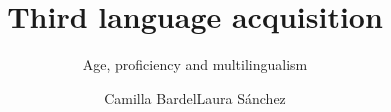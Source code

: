 \renewcommand{\lsSeries}{eurosla}
\renewcommand{\lsSeriesNumber}{}

\title{Third language acquisition}
\subtitle{Age, proficiency and multilingualism}
\author{Camilla Bardel\lastand Laura Sánchez}
\renewcommand{\lsID}{268}
